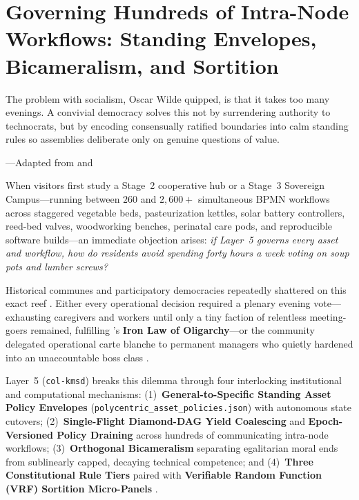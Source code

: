 \chapter{Governing Hundreds of Intra-Node Workflows: Standing Envelopes, Bicameralism, and Sortition}
\label{ch:l5-intranode-envelopes}

\epigraph{The problem with socialism, Oscar Wilde quipped, is that it takes too many evenings. A convivial democracy solves this not by surrendering authority to technocrats, but by encoding consensually ratified boundaries into calm standing rules so assemblies deliberate only on genuine questions of value.}{---Adapted from \textcite{mansbridge1980} and \textcite{illich1973}}

When visitors first study a Stage~2 cooperative hub or a Stage~3 Sovereign Campus---running
between $260$ and $2{,}600+$ simultaneous BPMN workflows across staggered vegetable beds,
pasteurization kettles, solar battery controllers, reed-bed valves, woodworking benches,
perinatal care pods, and reproducible software builds---an immediate objection arises:
\textit{if Layer~5 governs every asset and workflow, how do residents avoid spending forty hours
a week voting on soup pots and lumber screws?}

Historical communes and participatory democracies repeatedly shattered on this exact reef
\parencite{kanter1972,mansbridge1980}. Either every operational decision required a plenary
evening vote---exhausting caregivers and workers until only a tiny faction of relentless
meeting-goers remained, fulfilling \textcite{michels1911}'s \textbf{Iron Law of Oligarchy}---or the
community delegated operational carte blanche to permanent managers who quietly hardened into an
unaccountable boss class \parencite{cornforth1995}.

Layer~5 (\texttt{col-kmsd}) breaks this dilemma through four interlocking institutional and
computational mechanisms: (1)~\textbf{General-to-Specific Standing Asset Policy Envelopes}
(\texttt{polycentric\_asset\_policies.json}) with autonomous state cutovers; (2)~\textbf{Single-Flight
Diamond-DAG Yield Coalescing} and \textbf{Epoch-Versioned Policy Draining} across hundreds of
communicating intra-node workflows; (3)~\textbf{Orthogonal Bicameralism} separating egalitarian moral
ends from sublinearly capped, decaying technical competence; and (4)~\textbf{Three Constitutional Rule
Tiers} paired with \textbf{Verifiable Random Function (VRF) Sortition Micro-Panels}
\parencite{micali1999vrf,sintomer2010sortition}.


